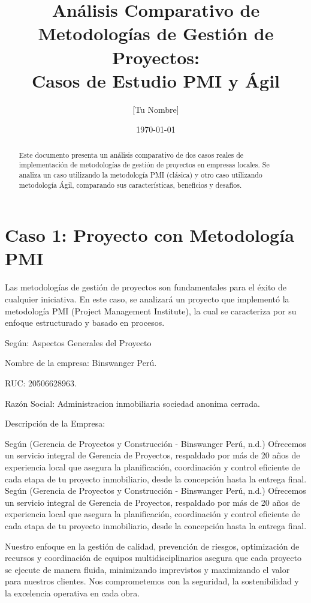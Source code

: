 \documentclass[12pt,a4paper]{article}
\title{Análisis Comparativo de Metodologías de Gestión de Proyectos:\\ Casos de Estudio PMI y Ágil}
\author{[Tu Nombre]}
\date{\today}
\begin{document}
\maketitle

\begin{abstract}
Este documento presenta un análisis comparativo de dos casos reales de implementación de metodologías de gestión de proyectos en empresas locales. Se analiza un caso utilizando la metodología PMI (clásica) y otro caso utilizando metodología Ágil, comparando sus características, beneficios y desafíos.
\end{abstract}

\section{Caso 1: Proyecto con Metodología PMI}

Las metodologías de gestión de proyectos son fundamentales para el éxito de cualquier iniciativa. En este caso, se analizará un proyecto que implementó la metodología PMI (Project Management Institute), la cual se caracteriza por su enfoque estructurado y basado en procesos.

Según: Aspectos Generales del Proyecto 

Nombre de la empresa: Binswanger Perú.

RUC: 20506628963.

Razón Social: Administracion inmobiliaria sociedad anonima cerrada.

Descripción de la Empresa:


Según (Gerencia de Proyectos y Construcción - Binswanger Perú, n.d.) Ofrecemos un servicio integral de Gerencia de Proyectos, respaldado por más de 20 años de experiencia local que asegura la planificación, coordinación y control eficiente de cada etapa de tu proyecto inmobiliario, desde la concepción hasta la entrega final.
Según (Gerencia de Proyectos y Construcción - Binswanger Perú, n.d.) Ofrecemos un servicio integral de Gerencia de Proyectos, respaldado por más de 20 años de experiencia local que asegura la planificación, coordinación y control eficiente de cada etapa de tu proyecto inmobiliario, desde la concepción hasta la entrega final.

Nuestro enfoque en la gestión de calidad, prevención de riesgos, optimización de recursos y coordinación de equipos multidisciplinarios asegura que cada proyecto se ejecute de manera fluida, minimizando imprevistos y maximizando el valor para nuestros clientes. Nos comprometemos con la seguridad, la sostenibilidad y la excelencia operativa en cada obra. 
\end{document}
